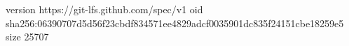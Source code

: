 version https://git-lfs.github.com/spec/v1
oid sha256:06390707d5d56f23cbdf834571ee4829adcf0035901dc835f24151cbe18259e5
size 25707
